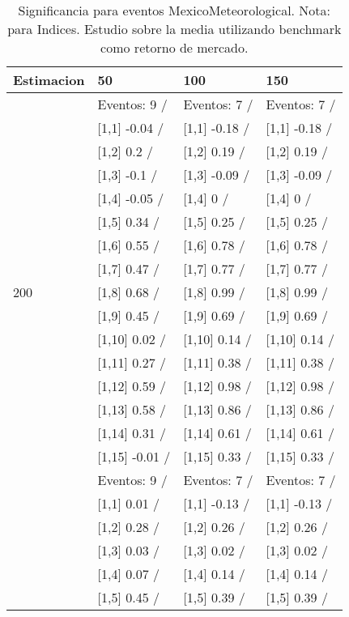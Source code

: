 \begin{table}

\caption{Significancia para eventos MexicoMeteorological. Nota: para Indices. Estudio sobre la media utilizando benchmark como retorno de mercado.}
\centering
\begin{tabular}[t]{llll}
\toprule
Estimacion & 50 & 100 & 150\\
\midrule
 & Eventos:  9 / & Eventos:  7 / & Eventos:  7 /\\
 & {}[1,1] -0.04  / & {}[1,1] -0.18  / & {}[1,1] -0.18  /\\
 & {}[1,2] 0.2  / & {}[1,2] 0.19  / & {}[1,2] 0.19  /\\
 & {}[1,3] -0.1  / & {}[1,3] -0.09  / & {}[1,3] -0.09  /\\
 & {}[1,4] -0.05  / & {}[1,4] 0  / & {}[1,4] 0  /\\
\addlinespace
 & {}[1,5] 0.34  / & {}[1,5] 0.25  / & {}[1,5] 0.25  /\\
 & {}[1,6] 0.55  / & {}[1,6] 0.78  / & {}[1,6] 0.78  /\\
 & {}[1,7] 0.47  / & {}[1,7] 0.77  / & {}[1,7] 0.77  /\\
200 & {}[1,8] 0.68  / & {}[1,8] 0.99  / & {}[1,8] 0.99  /\\
 & {}[1,9] 0.45  / & {}[1,9] 0.69  / & {}[1,9] 0.69  /\\
\addlinespace
 & {}[1,10] 0.02  / & {}[1,10] 0.14  / & {}[1,10] 0.14  /\\
 & {}[1,11] 0.27  / & {}[1,11] 0.38  / & {}[1,11] 0.38  /\\
 & {}[1,12] 0.59  / & {}[1,12] 0.98  / & {}[1,12] 0.98  /\\
 & {}[1,13] 0.58  / & {}[1,13] 0.86  / & {}[1,13] 0.86  /\\
 & {}[1,14] 0.31  / & {}[1,14] 0.61  / & {}[1,14] 0.61  /\\
\addlinespace
 & {}[1,15] -0.01  / & {}[1,15] 0.33  / & {}[1,15] 0.33  /\\
 & Eventos:  9 / & Eventos:  7 / & Eventos:  7 /\\
 & {}[1,1] 0.01  / & {}[1,1] -0.13  / & {}[1,1] -0.13  /\\
 & {}[1,2] 0.28  / & {}[1,2] 0.26  / & {}[1,2] 0.26  /\\
 & {}[1,3] 0.03  / & {}[1,3] 0.02  / & {}[1,3] 0.02  /\\
\addlinespace
 & {}[1,4] 0.07  / & {}[1,4] 0.14  / & {}[1,4] 0.14  /\\
 & {}[1,5] 0.45  / & {}[1,5] 0.39  / & {}[1,5] 0.39  /\\

\end{tabular}
\end{table}

